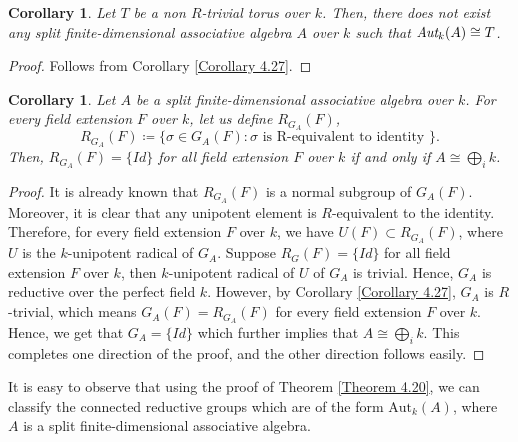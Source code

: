 \documentclass[12pt]{amsart}
\newtheorem{corollary}[theorem]{Corollary}
\theoremstyle{definition}
\numberwithin{equation}{section}
\begin{document}
\vskip2mm
\begin{corollary}\label{Corollary 4.28}
Let $T$ be a non $R$-trivial torus over $k$. Then, there does not exist any split finite-dimensional associative algebra $A$ over $k$ such that $\emph{\text{Aut}}_k(A)\cong T$.
\end{corollary}
\vskip 1mm
\begin{proof}
Follows from Corollary \ref{Corollary 4.27}.
\end{proof}
\vskip2mm
\begin{corollary}\label{Corollary 4.29}
Let $A$ be a split finite-dimensional associative algebra over $k$. For every field extension $F$ over $k$, let us define $R_{G_A}(F)$, \[R_{G_A}(F)\coloneq\{\sigma\in G_A(F) : \sigma \text{ is R-equivalent to identity } \} .\] Then, $R_{G_A}(F)=\{Id\}$ for all field extension $F$ over $k$ if and only if $A\cong \bigoplus_i k$.
\end{corollary}
\vskip1mm
\begin{proof}
It is already known that $R_{G_A}(F)$ is a normal subgroup of $G_A(F)$. Moreover, it is clear that any unipotent element is $R$-equivalent to the identity. Therefore, for every field extension $F$ over $k$, we have $U(F)\subset R_{G_A}(F)$, where $U$ is the $k$-unipotent radical of $G_A$. Suppose $R_G(F)=\{Id\}$ for all field extension $F$ over $k$, then $k$-unipotent radical of $U$ of $G_A$ is trivial. Hence, $G_A$ is reductive over the perfect field $k$. However, by Corollary \ref{Corollary 4.27}, $G_A$ is $R$-trivial, which means $G_A(F)=R_{G_A}(F)$ for every field extension $F$ over $k$. Hence, we get that $G_A=\{Id\}$ which further implies that $A\cong \bigoplus_i k$. This completes one direction of the proof, and the other direction follows easily.
\end{proof}
\vskip2mm
\noindent
It is easy to observe that using the proof of Theorem \ref{Theorem 4.20}, we can classify the connected reductive groups which are of the form $\text{Aut}_k(A)$, where $A$ is a split finite-dimensional associative algebra.

\vskip2mm
\end{document}
